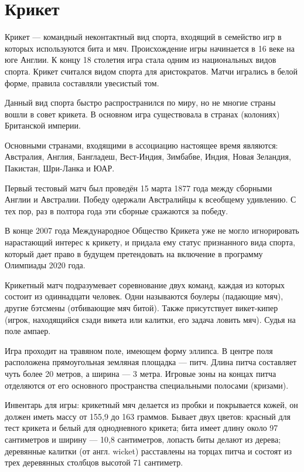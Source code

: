 \section{Крикет}

Крикет --- командный неконтактный вид спорта, входящий в семейство игр в которых используются бита и мяч. Происхождение игры начинается в 16 веке на юге Англии. К концу 18 столетия игра стала одним из национальных видов спорта. Крикет считался видом спорта для аристократов. Матчи игрались в белой форме, правила составляли увесистый том.

Данный вид спорта быстро распространился по миру, но не многие страны вошли в совет крикета. В основном игра существовала в странах (колониях) Британской империи.

Основными странами, входящими в ассоциацию настоящее время являются: Австралия, Англия, Бангладеш, Вест-Индия, Зимбабве, Индия, Новая Зеландия, Пакистан, Шри-Ланка и ЮАР.

Первый тестовый матч был проведён 15 марта 1877 года между сборными Англии и Австралии. Победу одержали Австралийцы к всеобщему удивлению. С тех пор, раз в полтора года эти сборные сражаются за победу.

В конце 2007 года Международное Общество Крикета уже не могло игнорировать нарастающий интерес к крикету, и придала ему статус признанного вида спорта, который дает право в будущем претендовать на включение в программу Олимпиады 2020 года.

Крикетный матч подразумевает соревнование двух команд, каждая из которых состоит из одиннадцати человек. Одни называются боулеры (падающие мяч), другие бэтсмены (отбивающие мяч битой). Также присутствует викет-кипер (игрок, находящийся сзади викета или калитки, его задача ловить мяч). Судья на поле ампаер.

Игра проходит на травяном поле, имеющем форму эллипса. В центре поля расположена прямоугольная земляная площадка --- питч. Длина питча составляет чуть более 20 метров, а ширина --- 3 метра. Игровые зоны на концах питча отделяются от его основного пространства специальными полосами (кризами).

Инвентарь для игры: крикетный мяч делается из пробки и покрывается кожей, он должен иметь массу от 155,9 до 163 граммов. Бывает двух цветов: красный для тест крикета и белый для однодневного крикета; бита имеет длину около 97 сантиметров и ширину --- 10,8 сантиметров, лопасть биты делают из дерева; деревянные калитки (от англ. wicket) расставлены на торцах питча и состоят из трех деревянных столбцов высотой 71 сантиметр.

